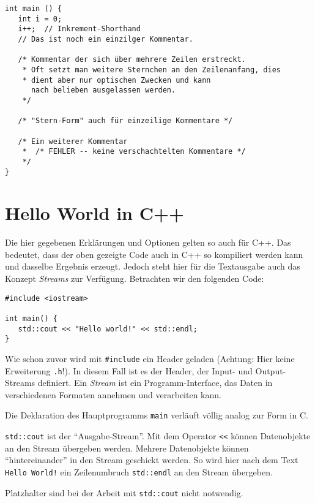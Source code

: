 \begin{codebox}
\begin{verbatim}
int main () {
   int i = 0;
   i++;  // Inkrement-Shorthand
   // Das ist noch ein einzilger Kommentar.

   /* Kommentar der sich über mehrere Zeilen erstreckt.
    * Oft setzt man weitere Sternchen an den Zeilenanfang, dies
    * dient aber nur optischen Zwecken und kann
      nach belieben ausgelassen werden.
    */
    
   /* "Stern-Form" auch für einzeilige Kommentare */
   
   /* Ein weiterer Kommentar
    *  /* FEHLER -- keine verschachtelten Kommentare */ 
    */
}
\end{verbatim}
\end{codebox}

\section{Hello World in C++}
\begin{plusbox}
Die hier gegebenen Erklärungen und Optionen gelten so auch für C++. Das bedeutet, dass der oben gezeigte Code auch in C++ so kompiliert werden kann und dasselbe Ergebnis erzeugt. Jedoch steht hier für die Textausgabe auch das Konzept \emph{Streams} zur Verfügung. Betrachten wir den folgenden Code:

\begin{codebox}
\begin{verbatim}
#include <iostream>

int main() {
   std::cout << "Hello world!" << std::endl;
}
\end{verbatim}
\end{codebox}

Wie schon zuvor wird mit \texttt{#include} ein Header geladen (Achtung: Hier keine Erweiterung \texttt{.h}!). In diesem Fall ist es der Header, der Input- und Output-Streams definiert. Ein \emph{Stream} ist ein Programm-Interface, das Daten in verschiedenen Formaten annehmen und verarbeiten kann.

Die Deklaration des Hauptprogramms \texttt{main} verläuft völlig analog zur Form in C.

\texttt{std::cout} ist der \enquote{Ausgabe-Stream}. Mit dem Operator \texttt{<{}<} können Datenobjekte an den Stream übergeben werden. Mehrere Datenobjekte können \enquote{hintereinander} in den Stream geschickt werden. So wird hier nach dem Text \texttt{Hello World!} ein Zeilenumbruch \texttt{std::endl} an den Stream übergeben.

Platzhalter sind bei der Arbeit mit \texttt{std::cout} nicht notwendig.
\end{plusbox}

